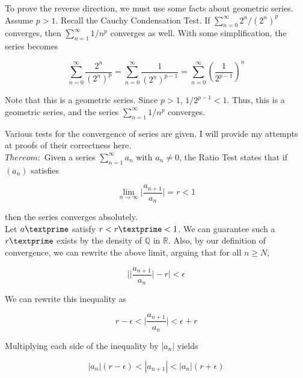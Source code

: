 \documentclass{article}
\begin{document}
To prove the reverse direction, we must use some facts about geometric series. Assume $p > 1$. Recall the Cauchy Condensation Test. If $\sum_{n=0}^{\infty} 2^n/(2^n)^p$ converges, then $\sum_{n=1}^{\infty} 1/n^p$ converges as well. With some simplification, the series becomes

\begin{equation}
    \sum_{n=0}^{\infty} \frac{2^n}{(2^n)^p} = \sum_{n=0}^{\infty} \frac{1}{(2^n)^{p-1}} = \sum_{n=0}^{\infty} (\frac{1}{2^{p-1}})^n
\end{equation}

Note that this is a geometric series. Since $p > 1$, $1/2^{p-1} < 1$. Thus, this is a geometric series, and the series $\sum_{n=1}^{\infty} 1/n^p$ converges. 

\newpage

Various tests for the convergence of series are given. I will provide my attempts at proofs of their correctness here. \\

$Thereom:$ Given a series $\sum_{n=1}^{\infty} a_n$ with $a_n \neq 0$, the Ratio Test states that if $(a_n)$ satisfies 

\begin{equation}
    \lim_{n\to\infty} \bigg|\frac{a_{n+1}}{a_n}\bigg| = r < 1
\end{equation}

then the series converges absolutely. \\

Let $a\textprime$ satisfy $r < r\textprime < 1$. We can guarantee such a $r\textprime$ exists by the density of $\mathbb{Q}$ in $\mathbb{R}$. Also, by our definition of convergence, we can rewrite the above limit, arguing that for all $n \geq N$, 

\begin{equation}
    \bigg|\bigg|\frac{a_{n+1}}{a_n}\bigg| - r\bigg| < \epsilon
\end{equation}


We can rewrite this inequality as

\begin{equation}
    r - \epsilon <\bigg|\frac{a_{n+1}}{a_n}\bigg| < \epsilon + r
\end{equation}


Multiplying each side of the inequality by $|a_n|$ yields

\begin{equation}
    |a_n|(r-\epsilon) < |a_{n+1}| < |a_n|(r+\epsilon)
\end{equation}
\end{document}

